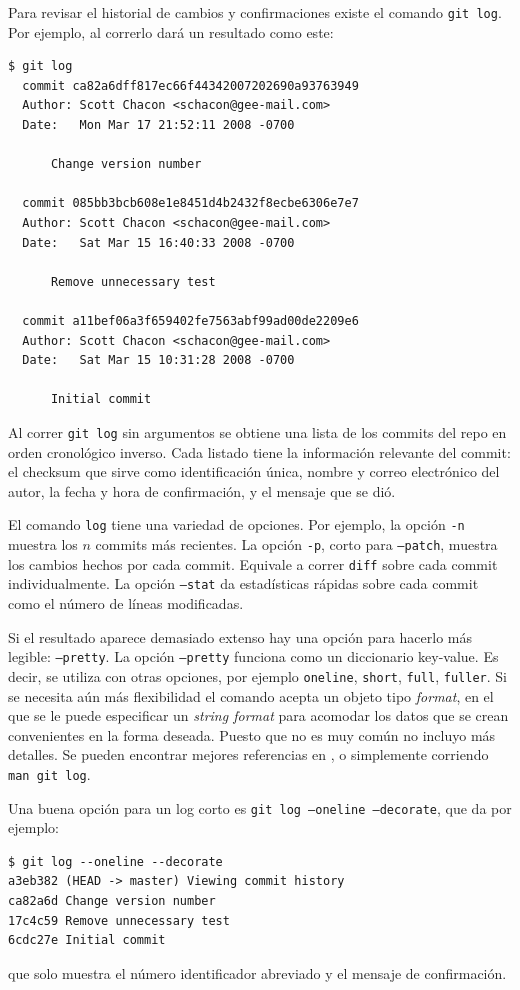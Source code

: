 \documentclass[spanish, 12pt, a4paper]{article}
\begin{document}
Para revisar el historial de cambios y confirmaciones existe el comando \texttt{git log}.
Por ejemplo, al correrlo dará un resultado como este:
\begin{lstlisting}
$ git log
  commit ca82a6dff817ec66f44342007202690a93763949
  Author: Scott Chacon <schacon@gee-mail.com>
  Date:   Mon Mar 17 21:52:11 2008 -0700

      Change version number

  commit 085bb3bcb608e1e8451d4b2432f8ecbe6306e7e7
  Author: Scott Chacon <schacon@gee-mail.com>
  Date:   Sat Mar 15 16:40:33 2008 -0700

      Remove unnecessary test

  commit a11bef06a3f659402fe7563abf99ad00de2209e6
  Author: Scott Chacon <schacon@gee-mail.com>
  Date:   Sat Mar 15 10:31:28 2008 -0700

      Initial commit
\end{lstlisting}

Al correr \texttt{git log} sin argumentos se obtiene una lista de los commits del repo en orden cronológico inverso.
Cada listado tiene la información relevante del commit: el checksum que sirve como identificación única, nombre y correo electrónico del autor, la fecha y hora de confirmación, y el mensaje que se dió.

El comando \texttt{log} tiene una variedad de opciones.
Por ejemplo, la opción \texttt{-n} muestra los $n$ commits más recientes.
La opción \texttt{-p}, corto para \texttt{--patch}, muestra los cambios hechos por cada commit.
Equivale a correr \texttt{diff} sobre cada commit individualmente.
La opción \texttt{--stat} da estadísticas rápidas sobre cada commit como el número de líneas modificadas.

Si el resultado aparece demasiado extenso hay una opción para hacerlo más legible: \texttt{--pretty}.
La opción \texttt{--pretty} funciona como un diccionario key-value.
Es decir, se utiliza con otras opciones, por ejemplo \texttt{oneline}, \texttt{short}, \texttt{full}, \texttt{fuller}.
Si se necesita aún más flexibilidad el comando acepta un objeto tipo \textit{format}, en el que se le puede especificar un \textit{string format} para acomodar los datos que se crean convenientes en la forma deseada.
Puesto que no es muy común no incluyo más detalles. Se pueden encontrar mejores referencias en \cite[pág.~88]{chacon-2009}, o simplemente corriendo \texttt{man git log}.

Una buena opción para un log corto es \texttt{git log --oneline --decorate}, que da por ejemplo:
\begin{lstlisting}
$ git log --oneline --decorate
a3eb382 (HEAD -> master) Viewing commit history
ca82a6d Change version number
17c4c59 Remove unnecessary test
6cdc27e Initial commit
\end{lstlisting}
que solo muestra el número identificador abreviado y el mensaje de confirmación.
\end{document}
